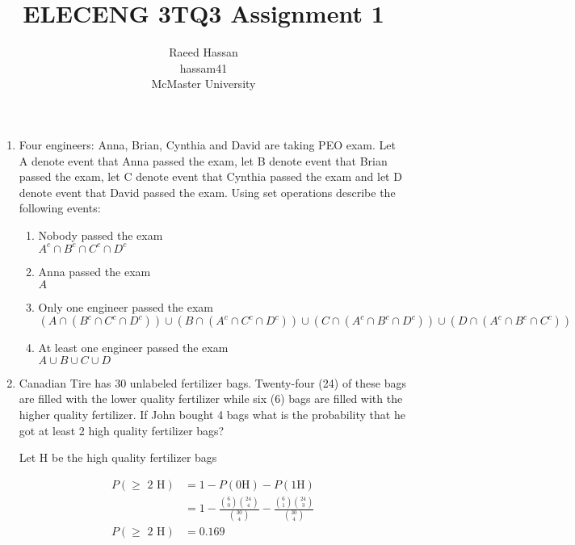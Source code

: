 \documentclass[12pt]{article}
\title{ELECENG 3TQ3 Assignment 1}
\author{Raeed Hassan \\ hassam41 \\ McMaster University}
\begin{document}
\maketitle
\pagebreak
\begin{enumerate}
    \item Four engineers: Anna, Brian, Cynthia and David are taking PEO exam. Let A denote event that Anna passed the exam, let B denote event that Brian passed the exam, let C denote event that Cynthia passed the exam and let D denote event that David passed the exam. Using set operations describe the following events:
    \begin{enumerate}
        \item Nobody passed the exam \\
        $A^c \cap B^c \cap C^c \cap D^c $
        \item Anna passed the exam \\
        $A$
        \item Only one engineer passed the exam \\
        $(A \cap (B^c \cap C^c \cap D^c)) \cup (B \cap (A^c \cap C^c \cap D^c)) \cup (C \cap (A^c \cap B^c \cap D^c)) \cup (D \cap (A^c \cap B^c \cap C^c)) $
        \item At least one engineer passed the exam \\
        $A \cup B \cup C \cup D$
    \end{enumerate}
    \item Canadian Tire has 30 unlabeled fertilizer bags. Twenty-four (24) of these bags are filled with the lower quality fertilizer while six (6) bags are filled with the higher quality fertilizer. If John bought 4 bags what is the probability that he got at least 2 high quality fertilizer bags?
    \begin{center}
        Let H be the high quality fertilizer bags
    \end{center}
    \[
    \begin{aligned}
        P(\text{$\geq$ 2 H}) &= 1 - P(0\text{H}) - P(1\text{H}) \\
        &= 1 - \frac{{6 \choose 0}{24 \choose 4}}{{30 \choose 4}} - \frac{{6 \choose 1}{24 \choose 3}}{{30 \choose 4}} \\
        P(\text{$\geq$ 2 H}) &= 0.169
    \end{aligned}    
    \]
    

\end{enumerate}
\end{document}

